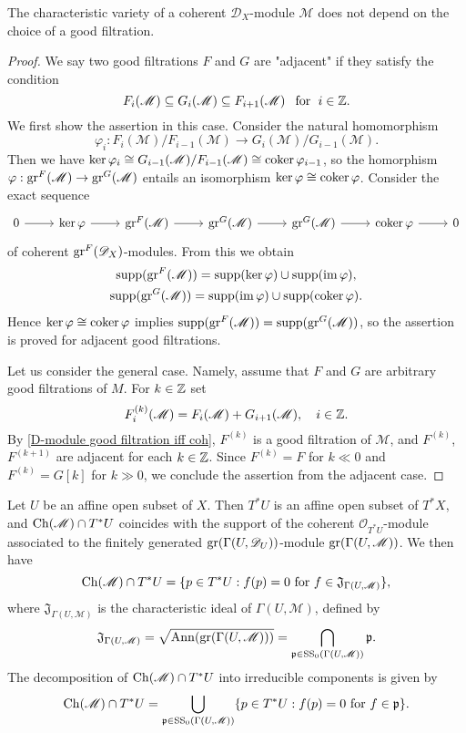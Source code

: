 \begin{theorem}\label{D-module coherent module char variety independent filtration}
The characteristic variety of a coherent $\mathscr{D}_X$-module $\mathscr{M}$ does not depend on the choice of a good filtration.
\end{theorem}
\begin{proof}
We say two good filtrations $F$ and $G$ are "adjacent" if they satisfy the condition
\[F_i(\mathscr{M})\subseteq G_i(\mathscr{M})\subseteq F_{i+1}(\mathscr{M})\hspace{8pt}\text{for}\hspace{6pt} i\in\mathbb{Z}.\]
We first show the assertion in this case. Consider the natural homomorphism
\[\varphi_i:F_i(\mathscr{M})/F_{i-1}(\mathscr{M})\to G_i(\mathscr{M})/G_{i-1}(\mathscr{M}).\]
Then we have $\operatorname{ker}\varphi_i\cong G_{i-1}(\mathscr{M})/F_{i-1}(\mathscr{M})\cong\operatorname{coker}\varphi_{i-1}$, so the homorphism $\varphi:\mathrm{gr}^F(\mathscr{M})\to \mathrm{gr}^G(\mathscr{M})$ entails an isomorphism $\operatorname{ker}\varphi\cong\operatorname{coker}\varphi$. Consider the exact sequence
\[\begin{tikzcd}
0\ar[r]&\ker\varphi\ar[r]&\gr^F(\mathscr{M})\ar[r]&\gr^G(\mathscr{M})\ar[r]&\gr^G(\mathscr{M})\ar[r]&\coker\varphi\ar[r]&0
\end{tikzcd}\]
of coherent $\mathrm{gr}^F(\mathscr{D}_X)$-modules. From this we obtain
\begin{gather*}
\mathrm{supp}(\mathrm{gr}^F(\mathscr{M}))=\mathrm{supp}(\operatorname{ker}\varphi)\cup\mathrm{supp}(\operatorname{im}\varphi),\\
\mathrm{supp}(\mathrm{gr}^G(\mathscr{M}))=\mathrm{supp}(\operatorname{im}\varphi)\cup\mathrm{supp}(\operatorname{coker}\varphi).
\end{gather*}
Hence $\operatorname{ker}\varphi\cong\operatorname{coker}\varphi$ implies $\mathrm{supp}(\mathrm{gr}^F(\mathscr{M}))=\mathrm{supp}(\mathrm{gr}^G(\mathscr{M}))$, so the assertion is proved for adjacent good filtrations.\par
Let us consider the general case. Namely, assume that $F$ and $G$ are arbitrary good filtrations of $M$. For $k\in\mathbb{Z}$ set
\[F_i^{(k)}(\mathscr{M})=F_i(\mathscr{M})+G_{i+1}(\mathscr{M}),\quad i\in\mathbb{Z}.\]
By \cref{D-module good filtration iff coh}, $F^{(k)}$ is a good filtration of $\mathscr{M}$, and $F^{(k)}$, $F^{(k+1)}$ are adjacent for each $k\in\mathbb{Z}$. Since $F^{(k)}=F$ for $k\ll 0$ and $F^{(k)}=G[k]$ for $k\gg 0$, we conclude the assertion from the adjacent case.
\end{proof}

Let $U$ be an affine open subset of $X$. Then $T^*U$ is an affine open subset of $T^*X$, and $\mathrm{Ch}(\mathscr{M})\cap T^*U$ coincides with the support of the coherent $\mathscr{O}_{T^*U}$-module associated to the finitely generated $\mathrm{gr}(\Gamma(U,\mathscr{D}_U))$-module $\mathrm{gr}(\Gamma(U,\mathscr{M}))$. We then have
\[\mathrm{Ch}(\mathscr{M})\cap T^*U=\{p\in T^*U:\text{$f(p)=0$ for $f\in\mathfrak{J}_{\Gamma(U,\mathscr{M})}$}\},\]
where $\mathfrak{J}_{\Gamma(U,\mathscr{M})}$ is the characteristic ideal of $\Gamma(U,\mathscr{M})$, defined by
\[\mathfrak{J}_{\Gamma(U,\mathscr{M})}=\sqrt{\mathrm{Ann}(\mathrm{gr}(\Gamma(U,\mathscr{M})))}=\bigcap_{\mathfrak{p}\in\mathrm{SS}_0(\Gamma(U,\mathscr{M}))}\mathfrak{p}.\]
The decomposition of $\mathrm{Ch}(\mathscr{M})\cap T^*U$ into irreducible components is given by
\[\mathrm{Ch}(\mathscr{M})\cap T^*U=\bigcup_{\mathfrak{p}\in\mathrm{SS}_0(\Gamma(U,\mathscr{M}))}\{p\in T^*U:\text{$f(p)=0$ for $f\in\mathfrak{p}$}\}.\]

